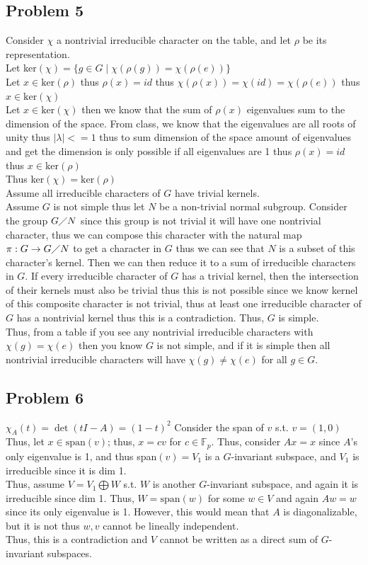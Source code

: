 \documentclass[12pt, letterpaper]{article}
\theoremstyle{definition}
\renewcommand{\t}[1]{\text{#1}}
\begin{document}
\subsection*{Problem 5}
Consider $\chi$ a nontrivial irreducible character on the table, and let $\rho$ be its representation.\\
Let ker$(\chi)=\{g \in G \mid \chi(\rho(g))=\chi(\rho(e))\}$\\
Let $x \in \t{ker}(\rho)$ thus $\rho(x)=id$ thus $\chi(\rho(x))=\chi(id)=\chi(\rho(e))$ thus $x \in \t{ker}(\chi)$\\
Let $x \in \t{ker}(\chi)$ then we know that the sum of $\rho(x)$ eigenvalues sum to the dimension of the space. From class, we know that the eigenvalues are all roots of unity thus $|\lambda|<=1$ thus to sum dimension of the space
amount of eigenvalues and get the dimension is only possible if all eigenvalues are 1 thus $\rho(x)=id$ thus $x \in \t{ker}(\rho)$\\
Thus ker$(\chi)=\t{ker}(\rho)$\\
Assume all irreducible characters of $G$ have trivial kernels.\\
Assume $G$ is not simple thus let $N$ be a non-trivial normal subgroup.
Consider the group $G\diagup N$ since this group is not trivial it will have one nontrivial character, thus we can compose this character with the natural map $\pi : G \rightarrow G\diagup N$ to get a character in $G$ thus we can see that $N$ is a subset of this character's kernel.
Then we can then reduce it to a sum of irreducible characters in $G$. If every irreducible character of $G$ has a trivial kernel, then the intersection of their kernels must also be trivial thus this is not possible since we know kernel of this composite character is not trivial,
thus at least one irreducible character of $G$ has a nontrivial kernel thus this is a contradiction. Thus, $G$ is simple.\\
Thus, from a table if you see any nontrivial irreducible characters with $\chi(g)=\chi(e)$ then you know $G$ is not simple, and if
it is simple then all nontrivial irreducible characters will have $\chi(g)\neq\chi(e)$ for all $g\in G$.

\newpage
\subsection*{Problem 6}
$\chi_A(t)=\det(tI-A)=(1-t)^2$
Consider the span of $v$ s.t. $v=(1,0)$\\
Thus, let $x \in \t{span}(v)$; thus, $x=cv$ for $c \in \mathbb{F}_p$.
Thus, consider $Ax=x$ since $A$'s only eigenvalue is 1, and thus span$(v) = V_1$ is a $G$-invariant subspace, and $V_1$ is irreducible since it is dim 1.\\
Thus, assume $V=V_1 \bigoplus W$ s.t. $W$ is another $G$-invariant subspace, and again it is irreducible since dim 1.
Thus, $W=\t{span}(w)$ for some $w \in V$ and again $Aw=w$ since its only eigenvalue is 1.
However, this would mean that $A$ is diagonalizable, but it is not thus $w,v$ cannot be lineally independent.\\
Thus, this is a contradiction and $V$ cannot be written as a direct sum of $G$-invariant subspaces.
\end{document}
